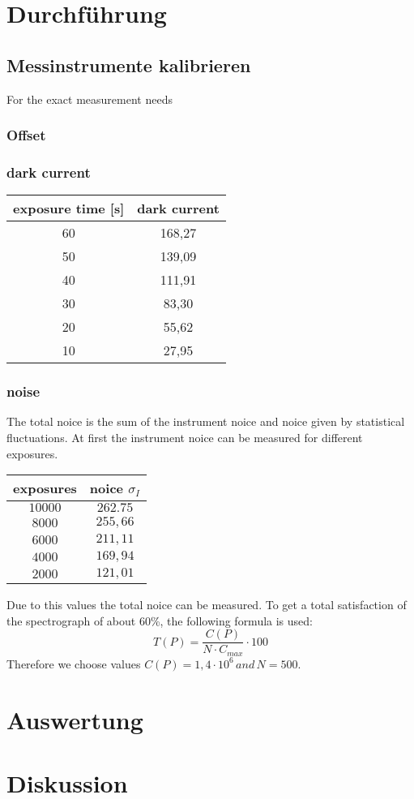 \documentclass[12pt]{article}
\begin{document}
\section{Durchführung}
  \subsection{Messinstrumente kalibrieren}
      For the exact measurement needs
    \subsubsection*{Offset}

    \subsubsection*{dark current}
      \begin{tabular}{c|c}
        exposure time [s] & dark current \\ \hline
        60 & 168,27 \\
        50 & 139,09 \\
        40 & 111,91 \\
        30 & 83,30 \\
        20 & 55,62 \\
        10 & 27,95
      \end{tabular}
    \subsubsection*{noise}
      \begin{multicols}{2}
        The total noice is the sum of the instrument noice and noice given by
        statistical fluctuations. At first the instrument noice can be measured
        for different exposures.
        \begin{tabular} {c|c}
          exposures & noice $\sigma_I$ \\ \hline
          $10 000$ & $262.75$\\
          $8 000$ & $255,66$\\
          $6 000$ & $211,11$\\
          $4 000$ & $169,94$\\
          $2 000$ & $121,01$
        \end{tabular}
        Due to this values the total noice can be measured.
        To get a total satisfaction of the spectrograph of about 60\%, the following
        formula is used:
        \begin{equation}
          T(P) = \frac{C(P)}{N \cdot C_{max}} \cdot 100
        \end{equation}
        Therefore we choose values $C(P)=1,4 \cdot 10^6 \, and \, N=500$.

      \end{multicols}

\section{Auswertung}

\section{Diskussion}
\end{document}
